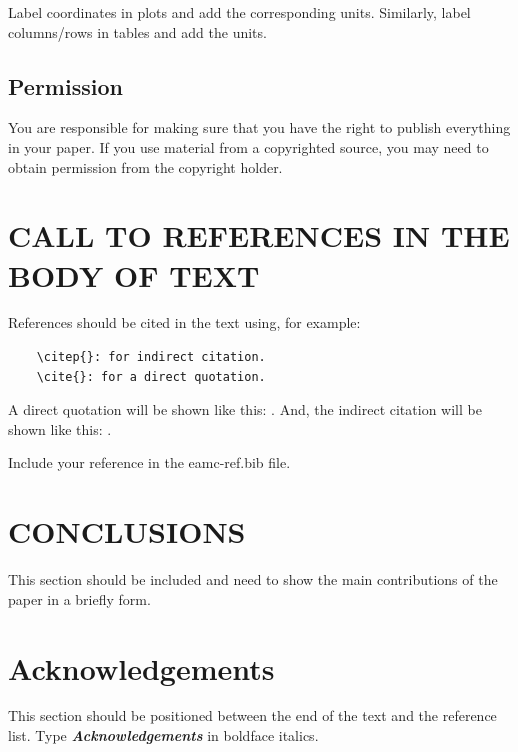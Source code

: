\documentclass{eamc-class}
\begin{document}
Label coordinates in plots and add the corresponding units. Similarly, label columns/rows in tables and add the units.

\subsection{Permission}
You are responsible for making sure that you have the right to publish everything in your paper. If you use material from a copyrighted source, you may need to obtain permission from the copyright holder.

\section{CALL TO REFERENCES IN THE BODY OF TEXT}
References should be cited in the text using, for example: 
\begin{verbatim}
    \citep{}: for indirect citation.
    \cite{}: for a direct quotation.
\end{verbatim}

A direct quotation will be shown like this: \citep{ArslanHansen1996}. And, the indirect citation will be shown like this: \cite{ArslanHansen1996}.

Include your reference in the eamc-ref.bib file.
    
\section{CONCLUSIONS}
This section should be included and need to show the main contributions of the paper in a briefly form.

\setcounter{secnumdepth}{0}
\section{Acknowledgements}

This section should be positioned between the end of the text and the reference list. Type \textbf{\textit{Acknowledgements}} in boldface italics.


\end{document}
